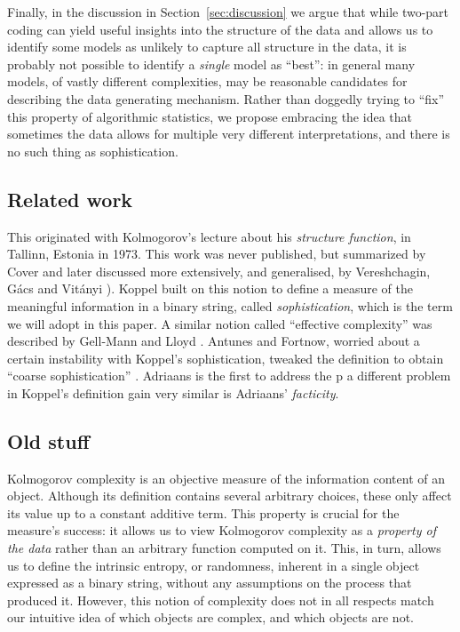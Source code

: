 \documentclass{style/llncs}
\begin{document}
Finally, in the discussion in Section~\ref{sec:discussion} we argue that while two-part coding can yield useful insights into the structure of the data and allows us to identify some models as unlikely to capture all structure in the data, it is probably not possible to identify a \emph{single} model as ``best'': in general many models, of vastly different complexities, may be reasonable candidates for describing the data generating mechanism. Rather than doggedly trying to ``fix'' this property of algorithmic statistics, we propose embracing the idea that sometimes the data allows for multiple very different interpretations, and there is no such thing as sophistication.

\subsection{Related work}
This originated with Kolmogorov's lecture about his \emph{structure function}, in Tallinn, Estonia in 1973. This work was never published, but summarized by Cover \cite{cover1985kolmogorov} and later discussed more extensively, and generalised, by Vereshchagin, G\'acs and Vit\'anyi \cite{vereshchagin2004kolmogorov,gacs2001algorithmic}). Koppel \cite{koppelSoph1988,koppel1991almost} built on this notion to define a measure of the meaningful information in a binary string, called \emph{sophistication}, which is the term we will adopt in this paper. A similar notion called ``effective complexity'' was described by Gell-Mann and Lloyd \cite{gellmann1996information}. Antunes and Fortnow, worried about a certain instability with Koppel's sophistication, tweaked the definition to obtain ``coarse sophistication'' \cite{antunes2009sophistication}. Adriaans is the first to address the p a different problem in Koppel's definition gain very similar is Adriaans' \emph{facticity}\cite{adriaans2012facticity}.


\subsection{Old stuff}

\noindent Kolmogorov complexity is an objective measure of the information content of an object. Although its definition contains several arbitrary choices, these only affect its value up to a constant additive term. This property is crucial for the measure's success: it allows us to view Kolmogorov complexity as a \emph{property of the data} rather than an arbitrary function computed on it. This, in turn, allows us to define the intrinsic entropy, or randomness, inherent in a single object expressed as a binary string, without any assumptions on the process that produced it. However, this notion of complexity does not in all respects match our intuitive idea of which objects are complex, and which objects are not.
\end{document}
